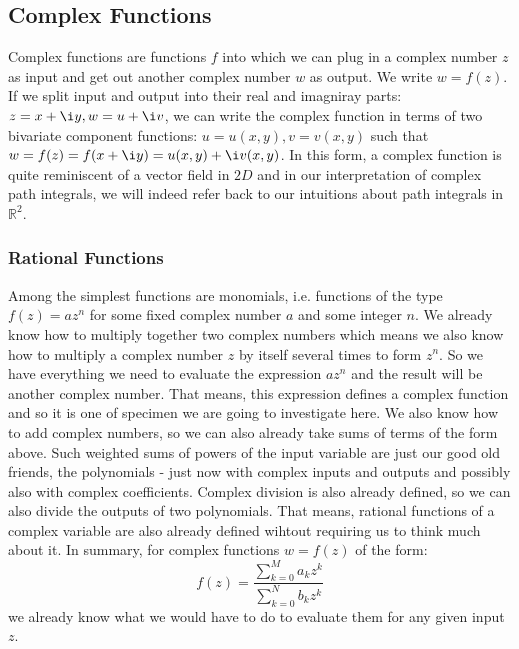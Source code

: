 \subsection{Complex Functions}
Complex functions are functions $f$ into which we can plug in a complex number $z$ as input and get out another complex number $w$ as output. We write $w = f(z)$. If we split input and output into their real and imagniray parts: $z = x + \i y, w = u  + \i v$, we can write the complex function in terms of two bivariate component functions: $u = u(x,y), v = v(x,y)$ such that $w = f(z) = f(x + \i y) = u(x,y) + \i v(x,y)$. In this form, a complex function is quite reminiscent of a vector field in $2D$ and in our interpretation of complex path integrals, we will indeed refer back to our intuitions about path integrals in $\mathbb{R}^2$.

\subsubsection{Rational Functions}
Among the simplest functions are monomials, i.e. functions of the type $f(z) = a z^n$ for some fixed complex number $a$ and some integer $n$. We already know how to multiply together two complex numbers which means we also know how to multiply a complex number $z$ by itself several times to form $z^n$. So we have everything we need to evaluate the expression $a z^n$ and the result will be another complex number. That means, this expression defines a complex function and so it is one of specimen we are going to investigate here. We also know how to add complex numbers, so we can also already take sums of terms of the form above. Such weighted sums of powers of the input variable are just our good old friends, the polynomials - just now with complex inputs and outputs and possibly also with complex coefficients. Complex division is also already defined, so we can also divide the outputs of two polynomials. That means, rational functions of a complex variable are also already defined wihtout requiring us to think much about it. In summary, for complex functions $w = f(z)$ of the form:
\begin{equation}
f(z) = \frac{\sum_{k=0}^{M} a_k z^k}{\sum_{k=0}^{N} b_k z^k}
\end{equation}
we already know what we would have to do to evaluate them for any given input $z$. 

